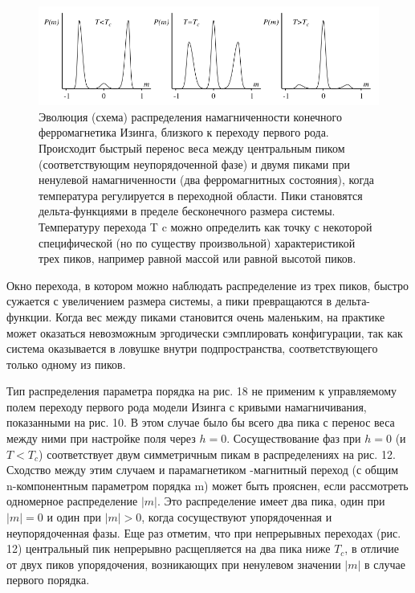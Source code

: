 \documentclass[11pt]{article}
\begin{document}
\begin{figure}[htp]
\centering
\includegraphics[scale=0.5]{fig18}
\caption{Эволюция (схема) распределения намагниченности конечного ферромагнетика Изинга, близкого к переходу первого рода. Происходит быстрый перенос веса между центральным пиком (соответствующим неупорядоченной фазе) и двумя пиками при ненулевой намагниченности (два ферромагнитных состояния), когда температура регулируется в переходной области. Пики становятся дельта-функциями в пределе бесконечного размера системы. Температуру перехода T c можно определить как точку с некоторой специфической (но по существу произвольной) характеристикой трех пиков, например равной массой или равной высотой пиков.}
\label{}
\end{figure}

Окно перехода, в котором можно наблюдать распределение из трех пиков, быстро сужается с увеличением размера системы, а пики превращаются в дельта-функции. Когда вес между пиками становится очень маленьким, на практике может оказаться невозможным эргодически сэмплировать конфигурации, так как система оказывается в ловушке внутри подпространства, соответствующего только одному из пиков.

Тип распределения параметра порядка на рис. 18 не применим к управляемому полем переходу первого рода модели Изинга с кривыми намагничивания, показанными на рис. 10. В этом случае было бы всего два пика с перенос веса между ними при настройке поля через $h = 0$. Сосуществование фаз при $h = 0$ (и $T <T_c$) соответствует двум симметричным пикам в распределениях на рис. 12. Сходство между этим случаем и парамагнетиком -магнитный переход (с общим n-компонентным параметром порядка m) может быть прояснен, если рассмотреть одномерное распределение $|m|$. Это распределение имеет два пика, один при $| m | = 0$ и один при $| m | > 0$, когда сосуществуют упорядоченная и неупорядоченная фазы. Еще раз отметим, что при непрерывных переходах (рис. 12) центральный пик непрерывно расщепляется на два пика ниже $T_c$, в отличие от двух пиков упорядочения, возникающих при ненулевом значении $|m|$ в случае первого порядка.
\end{document}
